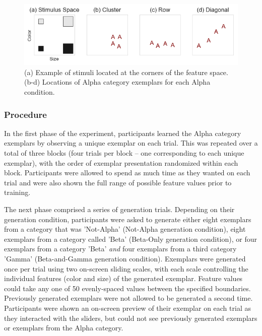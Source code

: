 \documentclass[10pt,letterpaper]{article}
\begin{document}
\begin{figure}%
\begin{center}
\includegraphics[width=\textwidth]{Figures/conditions.png}
\end{center}
\caption{(a) Example of stimuli located at the corners of the feature space. (b-d) Locations of Alpha category exemplars for each Alpha condition.} 
\label{fig:alphas}
\end{figure}


\subsubsection{Procedure}
In the first phase of the experiment, participants learned the Alpha category
exemplars by observing a unique exemplar on each trial. This
was repeated over a total of three blocks (four trials per block -- one
corresponding to each unique exemplar), with the order of exemplar presentation
randomized within each block. Participants were allowed to spend as much time as
they wanted on each trial and were also shown the full range of possible feature
values prior to training.

The next phase comprised a series of generation trials. Depending on their generation condition, participants were asked to generate either eight exemplars from a category that was 'Not-Alpha' (Not-Alpha generation condition), eight exemplars from a category called 'Beta' (Beta-Only generation condition), or four exemplars from a category 'Beta' \emph{and}
four exemplars from a third category 'Gamma' (Beta-and-Gamma generation condition). Exemplars were generated once per trial using two on-screen sliding scales, with each scale controlling the individual features (color and size) of the generated exemplar. Feature values could take any one of 50 evenly-spaced values between the specified boundaries. Previously generated exemplars were not allowed to be generated a second time. Participants were shown an on-screen preview of their exemplar on each trial as they interacted with the sliders, but could not see previously generated exemplars or exemplars from the Alpha category.
\end{document}
